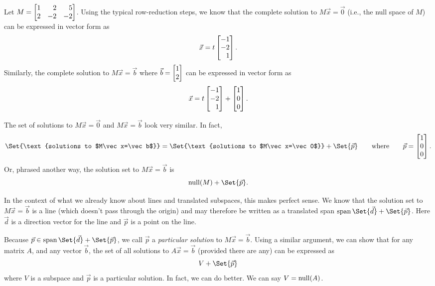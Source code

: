 
Let $M=\mat{1&2&5\\2&-2&-2}$. Using the typical row-reduction steps, we know that the complete solution to $M\vec x=\vec 0$
(i.e., the null space of $M$) can be expressed in vector form as
\[
	\vec x=t\mat{-1\\-2\\1}.
\]
Similarly, the complete solution to $M\vec x=\vec b$ where $\vec b=\mat{1\\2}$ can be expressed in vector form as
\[
	\vec x=t\mat{-1\\-2\\1}+\mat{1\\0\\0}.
\]

The set of solutions to $M\vec x=\vec 0$ and $M\vec x=\vec b$ look very similar. In fact, 
\[
	\Set{\text{solutions to $M\vec x=\vec b$}} = \Set{\text{solutions to $M\vec x=\vec 0$}}+\Set{\vec p}\qquad\text{where}
	\qquad \vec p=\mat{1\\0\\0}.
\]
Or, phrased another way, the solution set to $M\vec x=\vec b$ is
\[
	\Null(M)+\Set{\vec p}.
\]

In the context of what we already know about lines and translated subspaces, this makes perfect sense. We know
that the solution set to $M\vec x=\vec b$ is a line (which doesn't pass through the origin) and may therefore
be written as a translated span $\Span\Set{\vec d}+\Set{\vec p}$. Here $\vec d$ is a direction vector for the line
and $\vec p$ is a point on the line.

Because $\vec p\in\Span\Set{\vec d}+\Set{\vec p}$, we call $\vec p$ a \emph{particular solution} to $M\vec x=\vec b$.
 Using a similar argument, we can show that for any matrix $A$, and any vector $\vec b$, the set of all solutions
to $A\vec x=\vec b$ (provided there are any) can be expressed as
\[
	V+\Set{\vec p}
\]
where $V$ is a subspace and $\vec p$ is a particular solution. In fact, we can do better. We can say $V=\operatorname{null}(A)$.

